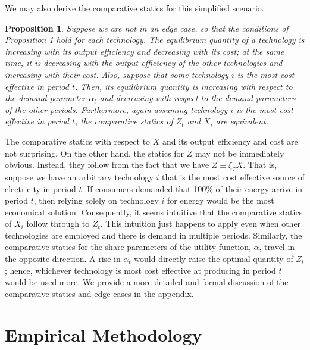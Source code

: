 \documentclass[11pt,a4paper]{extarticle}
\newtheorem{proposition}{Proposition}
\begin{document}
We may also derive the comparative statics for this simplified scenario.  
\begin{proposition}
	Suppose we are not in an edge case, so that the conditions of Proposition 1 hold for each technology. The equilibrium quantity of a technology is increasing with its output efficiency and decreasing with its cost; at the same time, it is decreasing with the output efficiency of the other technologies and increasing with their cost. Also, suppose that some technology $i$ is the most cost effective in period $t$. Then, its equilibrium quantity is increasing with respect to the demand parameter $\alpha_t$ and decreasing with respect to the demand parameters of the other periods. Furthermore, again assuming technology $i$ is the most cost effective in period $t$, the comparative statics of $Z_t$ and $X_i$ are equivalent. 
\end{proposition}	
The comparative statics with respect to $X$ and its output efficiency and cost are not surprising. On the other hand, the statics for $Z$ may not be immediately obvious. Instead, they follow from the fact that we have $Z \equiv \xi_T X$. That is, suppose we have an arbitrary technology $i$ that is the most cost effective source of electricity in period $t$. If consumers demanded that 100\% of their energy arrive in period $t$, then relying solely on technology $i$ for energy would be the most economical solution. Consequently, it seems intuitive that the comparative statics of $X_i$ follow through to $Z_t$. This intuition just happens to apply even when other technologies are employed and there is demand in multiple periods. Similarly, the comparative statics for the share parameters of the utility function, $\alpha$, travel in the opposite direction. A rise in $\alpha_t$ would directly raise the optimal quantity of $Z_t$; hence, whichever technology is most cost effective at producing in period $t$ would be used more. We provide a more detailed and formal discussion of the comparative statics and edge cases in the appendix. 





\section{Empirical Methodology}
\label{sec:methodology}
\end{document}

